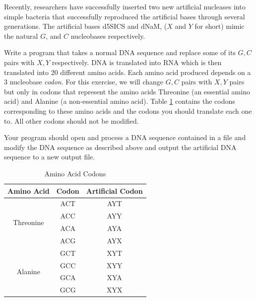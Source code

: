 \begin{exer}
Recently, researchers have successfully inserted two new 
artificial nucleases into simple bacteria that successfully 
reproduced the artificial bases through several generations.  
The artificial bases d5SICS and dNaM, ($X$ and
$Y$ for short) mimic the natural $G$, and $C$ nucleobases 
respectively.  

Write a program that takes a normal DNA sequence and replace 
some of its $G, C$ pairs with $X, Y$ respectively.  DNA is translated 
into RNA which is then translated into 20 different amino acids.  
Each amino acid produced depends on a 3 nucleobase \emph{codon}.  
For this exercise, we will change $G, C$ pairs with $X, Y$ pairs but
only in codons that represent the amino acids Threonine (an 
essential amino acid) and Alanine (a non-essential amino acid).
Table \ref{table:aminoAcids} contains the codons corresponding 
to these amino acids and the codons you  should translate each one 
to.  All other codons should not be modified.

Your program should open and process a DNA sequence contained in
a file and modify the DNA sequence as described above and output
the artificial DNA sequence to a new output file.  

\begin{table}[h]
\center
\begin{tabular}{|c|c|c|}
\hline
Amino Acid & Codon & Artificial Codon \\
\hline
\hline
\multirow{4}{*}{Threonine} & ACT & AYT \\
~& ACC & AYY \\
~& ACA & AYA \\
~& ACG & AYX\\
\hline
\multirow{4}{*}{Alanine} & GCT & XYT \\
~& GCC & XYY \\
~& GCA & XYA \\
~& GCG & XYX \\
\hline
\end{tabular}
\caption{Amino Acid Codons}
\label{table:aminoAcids}
\end{table}
\end{exer}


